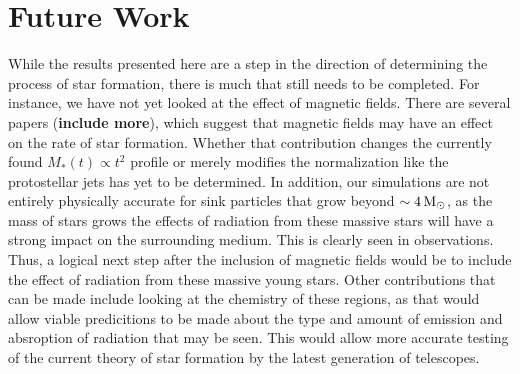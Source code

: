 \documentclass[../dissertation.tex]{subfiles}
\begin{document}
\section{Future Work}
While the results presented here are a step in the direction of determining the process of star formation, there is much that still needs to be completed. 
For instance, we have not yet looked at the effect of magnetic fields. 
There are several papers \citet{2017ApJ...838...40M} ({\bf include more}), which suggest that magnetic fields may have an effect on the rate of star formation. 
Whether that contribution changes the currently found $M_*(t) \propto t^2$ profile or merely modifies the normalization like the protostellar jets has yet to be determined. 
In addition, our simulations are not entirely physically accurate for sink particles that grow beyond $\sim 4 {\,\rm M}_\odot$, as the mass of stars grows the effects of radiation from these massive stars will have a strong impact on the surrounding medium. 
This is clearly seen in observations. Thus, a logical next step after the inclusion of magnetic fields would be to include the effect of radiation from these massive young stars. 
Other contributions that can be made include looking at the chemistry of these regions, as that would allow viable predicitions to be made about the type and amount of emission and absroption of radiation that may be seen. 
This would allow more accurate testing of the current theory of star formation by the latest generation of telescopes.
\end{document}
